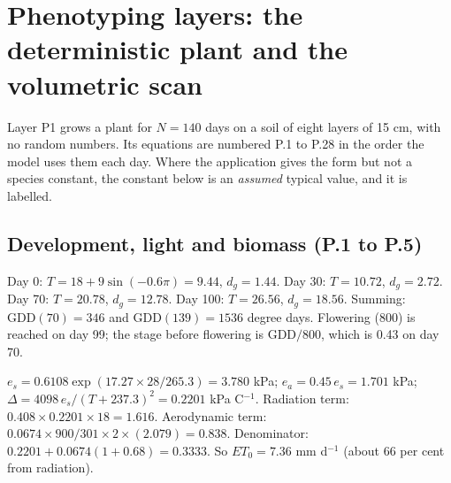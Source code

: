 \chapter{Phenotyping layers: the deterministic plant and the volumetric scan}\label{ch:pheno}

Layer P1 grows a plant for $N=140$ days on a soil of eight layers of 15 cm, with no random numbers. Its equations are numbered P.1 to P.28 in the order the model uses them each day. Where the application gives the form but not a species constant, the constant below is an \emph{assumed} typical value, and it is labelled.
\section{Development, light and biomass (P.1 to P.5)}

\sol  Day 0: $T=18+9\sin(-0.6\pi)=9.44$, $d_g=1.44$. Day 30: $T=10.72$, $d_g=2.72$. Day 70: $T=20.78$, $d_g=12.78$. Day 100: $T=26.56$, $d_g=18.56$. Summing: $\mathrm{GDD}(70)=346$ and $\mathrm{GDD}(139)=1536$ degree days. Flowering (800) is reached on day 99; the stage before flowering is $\mathrm{GDD}/800$, which is 0.43 on day 70.


\sol  $e_s=0.6108\exp(17.27\times28/265.3)=3.780$ kPa; $e_a=0.45\,e_s=1.701$ kPa; $\Delta=4098\,e_s/(T+237.3)^2=0.2201$ kPa \textdegree C$^{-1}$. Radiation term: $0.408\times0.2201\times18=1.616$. Aerodynamic term: $0.0674\times900/301\times2\times(2.079)=0.838$. Denominator: $0.2201+0.0674(1+0.68)=0.3333$. So $ET_0=7.36$ mm d$^{-1}$ (about 66 per cent from radiation).


